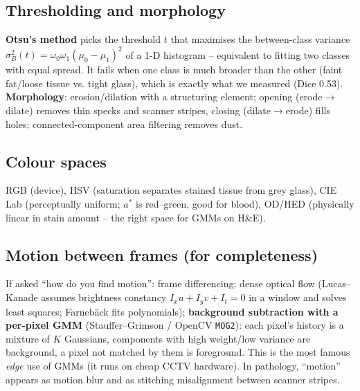\subsection{Thresholding and morphology}
\textbf{Otsu's method} picks the threshold $t$ that maximises the between-class variance
$\sigma_B^2(t)=\omega_0\omega_1(\mu_0-\mu_1)^2$ of a 1-D histogram -- equivalent to fitting two classes with equal
spread. It fails when one class is much broader than the other (faint fat/loose tissue vs. tight glass), which is
exactly what we measured (Dice 0.53). \textbf{Morphology}: erosion/dilation with a structuring element; opening
(erode$\to$dilate) removes thin specks and scanner stripes, closing (dilate$\to$erode) fills holes; connected-component
area filtering removes dust.

\subsection{Colour spaces}
RGB (device), HSV (saturation separates stained tissue from grey glass), CIE Lab (perceptually uniform; $a^*$ is
red--green, good for blood), OD/HED (physically linear in stain amount -- the right space for GMMs on H\&E).

\subsection{Motion between frames (for completeness)}
If asked ``how do you find motion'': frame differencing; dense optical flow (Lucas--Kanade assumes brightness
constancy $I_x u+I_y v+I_t=0$ in a window and solves least squares; Farneb\"ack fits polynomials);
\textbf{background subtraction with a per-pixel GMM} (Stauffer--Grimson / OpenCV \texttt{MOG2}): each pixel's
history is a mixture of $K$ Gaussians, components with high weight/low variance are background, a pixel not matched
by them is foreground. This is the most famous \emph{edge} use of GMMs (it runs on cheap CCTV hardware).
In pathology, ``motion'' appears as motion blur and as stitching misalignment between scanner stripes.

